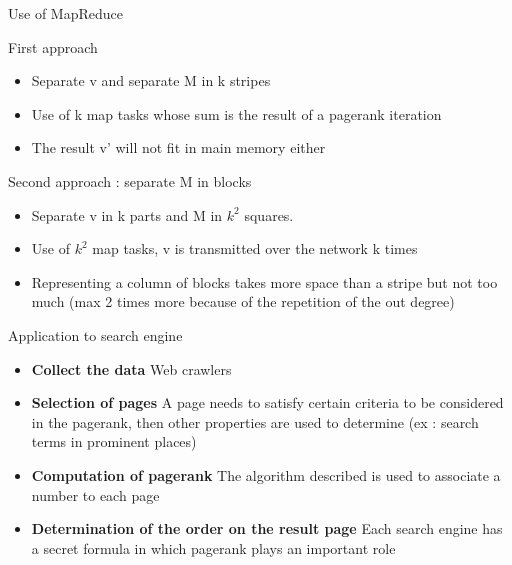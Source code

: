 \documentclass[10pt]{beamer}
\begin{document}
\begin{frame}{Use of MapReduce}
  \begin{block}{First approach}
    \begin{itemize}
      \item Separate v and separate M in k stripes
      \item Use of k map tasks whose sum is the result of a pagerank iteration
      \item The result v' will not fit in main memory either
    \end{itemize}
  \end{block}
  \begin{block}{Second approach : separate M in blocks}
    \begin{itemize}
      \item Separate v in k parts and M in $k^2$ squares.
      \item Use of $k^2$ map tasks, v is transmitted over the network k times
      \item Representing a column of blocks takes more space than a stripe but not too much (max 2 times more because of the repetition of the out degree)
    \end{itemize}
  \end{block}
\end{frame}
\begin{frame}{Application to search engine}
  \begin{itemize}
    \item \textbf{Collect the data} Web crawlers
    \item \textbf{Selection of pages} A page needs to satisfy certain criteria to be considered in the pagerank, then other properties are used to determine (ex : search terms in prominent places)
    \item \textbf{Computation of pagerank} The algorithm described is used to associate a number to each page
    \item \textbf{Determination of the order on the result page} Each search engine has a secret formula in which pagerank plays an important role
    \end{itemize}
\end{frame}
\end{document}
